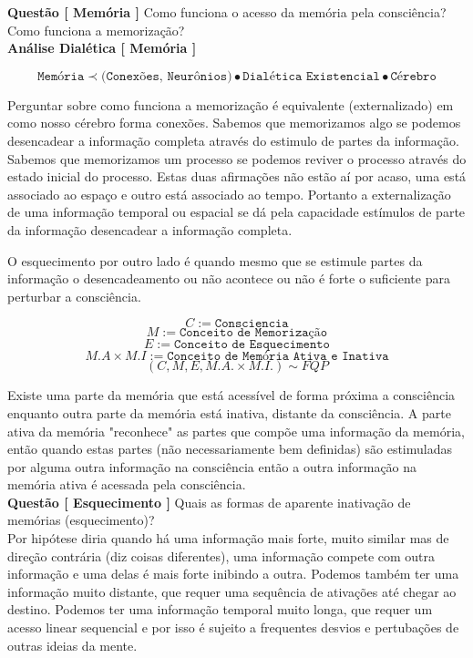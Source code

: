 \documentclass[10pt,a4paper]{report}
\begin{document}
\textbf{Questão [ Memória ]} Como funciona o acesso da memória pela consciência? Como funciona a memorização?\\

\textbf{Análise Dialética [ Memória ]}

$$ \texttt{Memória} \prec \texttt{(Conexões, Neurônios)} \bullet \texttt{Dialética Existencial} \bullet \texttt{Cérebro} $$

\hrulefill

Perguntar sobre como funciona a memorização é equivalente (externalizado) em como nosso cérebro forma conexões. Sabemos que memorizamos algo se podemos desencadear a informação completa através do estimulo de partes da informação. Sabemos que memorizamos um processo se podemos reviver o processo através do estado inicial do processo. Estas duas afirmações não estão aí por acaso, uma está associado ao espaço e outro está associado ao tempo. Portanto a externalização de uma informação temporal ou espacial se dá pela capacidade estímulos de parte da informação desencadear a informação completa.

O esquecimento por outro lado é quando mesmo que se estimule partes da informação o desencadeamento ou não acontece ou não é forte o suficiente para perturbar a consciência.

$$ C := \texttt{Consciencia} $$
$$ M := \texttt{Conceito de Memorização} $$
$$ E := \texttt{Conceito de Esquecimento} $$
$$ M.A \times M.I := \texttt{Conceito de Memória Ativa e Inativa} $$
$$ (C,M,E,M.A. \times M.I.) \sim FQP $$

\hrulefill

Existe uma parte da memória que está acessível de forma próxima a consciência enquanto outra parte da memória está inativa, distante da consciência. A parte ativa da memória "reconhece" as partes que compõe uma informação da memória, então quando estas partes (não necessariamente bem definidas) são estimuladas por alguma outra informação na consciência então a outra informação na memória ativa é acessada pela consciência.\\

\textbf{Questão [ Esquecimento ]} Quais as formas de aparente inativação de memórias (esquecimento)?\\

Por hipótese diria quando há uma informação mais forte, muito similar mas de direção contrária (diz coisas diferentes), uma informação compete com outra informação e uma delas é mais forte inibindo a outra. Podemos também ter uma informação muito distante, que requer uma sequência de ativações até chegar ao destino. Podemos ter uma informação temporal muito longa, que requer um acesso linear sequencial e por isso é sujeito a frequentes desvios e pertubações de outras ideias da mente.\\
\end{document}
